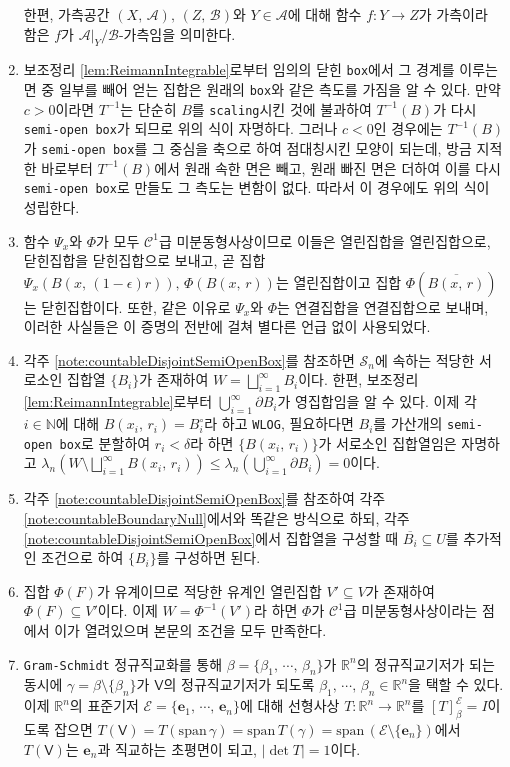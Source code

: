 \begin{enumerate}[label = \textsf{\textbf{\arabic*}}]
    한편, 가측공간 $(X,\,\mathcal{A}),\,(Z,\,\mathcal{B})$와 $Y\in\mathcal{A}$에 대해 함수 $f:Y\to Z$가 가측이라 함은 $f$가 $\mathcal{A}\vert_Y/\mathcal{B}$-가측임을 의미한다.
    \item 보조정리 \ref{lem:ReimannIntegrable}로부터 임의의 닫힌 \texttt{box}에서 그 경계를 이루는 면 중 일부를 빼어 얻는 집합은 원래의 \texttt{box}와 같은 측도를 가짐을 알 수 있다. 만약 $c>0$이라면 $T^{-1}$는 단순히 $B$를 \texttt{scaling}시킨 것에 불과하여 $T^{-1}(B)$가 다시 \texttt{semi-open box}가 되므로 위의 식이 자명하다. 그러나 $c<0$인 경우에는 $T^{-1}(B)$가 \texttt{semi-open box}를 그 중심을 축으로 하여 점대칭시킨 모양이 되는데, 방금 지적한 바로부터 $T^{-1}(B)$에서 원래 속한 면은 빼고, 원래 빠진 면은 더하여 이를 다시 \texttt{semi-open box}로 만들도 그 측도는 변함이 없다. 따라서 이 경우에도 위의 식이 성립한다.
    \item 함수 $\Psi_x$와 $\Phi$가 모두 $\mathcal{C}^1$급 미분동형사상이므로 이들은 열린집합을 열린집합으로, 닫힌집합을 닫힌집합으로 보내고, 곧 집합 $\Psi_x(B(x,\,(1-\epsilon)r)),\,\Phi(B(x,\,r))$는 열린집합이고 집합 $\Phi(\overline{B(x,\,r)})$는 닫힌집합이다. 또한, 같은 이유로 $\Psi_x$와 $\Phi$는 연결집합을 연결집합으로 보내며, 이러한 사실들은 이 증명의 전반에 걸쳐 별다른 언급 없이 사용되었다.
    \item 각주 \ref{note:countableDisjointSemiOpenBox}를 참조하면 $\mathcal{S}_n$에 속하는 적당한 서로소인 집합열 $\{B_i\}$가 존재하여 $W=\bigsqcup_{i=1}^\infty B_i$이다. 한편, 보조정리 \ref{lem:ReimannIntegrable}로부터 $\bigcup_{i=1}^\infty\partial B_i$가 영집합임을 알 수 있다. 이제 각 $i\in\mathbb{N}$에 대해 $B(x_i,\,r_i)=B_i^\circ$라 하고 \texttt{WLOG}, 필요하다면 $B_i$를 가산개의 \texttt{semi-open box}로 분할하여 $r_i<\delta$라 하면 $\{B(x_i,\,r_i)\}$가 서로소인 집합열임은 자명하고 $\lambda_n(W\setminus\bigsqcup_{i=1}^\infty B(x_i,\,r_i))\leq\lambda_n(\bigcup_{i=1}^\infty\partial B_i)=0$이다.
    \item 각주 \ref{note:countableDisjointSemiOpenBox}를 참조하여 각주 \ref{note:countableBoundaryNull}에서와 똑같은 방식으로 하되, 각주 \ref{note:countableDisjointSemiOpenBox}에서 집합열을 구성할 때 $\overline{B_i}\subseteq U$를 추가적인 조건으로 하여 $\{B_i\}$를 구성하면 된다.
    \item 집합 $\Phi(F)$가 유계이므로 적당한 유계인 열린집합 $V'\subseteq V$가 존재하여 $\Phi(F)\subseteq V'$이다. 이제 $W=\Phi^{-1}(V')$라 하면 $\Phi$가 $\mathcal{C}^1$급 미분동형사상이라는 점에서 이가 열려있으며 본문의 조건을 모두 만족한다.
    \item \texttt{Gram-Schmidt} 정규직교화를 통해 $\beta=\{\beta_1,\,\cdots,\,\beta_n\}$가 $\mathbb{R}^n$의 정규직교기저가 되는 동시에 $\gamma=\beta\setminus\{\beta_n\}$가 $\mathsf{V}$의 정규직교기저가 되도록 $\beta_1,\,\cdots,\,\beta_n\in\mathbb{R}^n$을 택할 수 있다. 이제 $\mathbb{R}^n$의 표준기저 $\mathcal{E}=\{\mathbf{e}_1,\,\cdots,\,\mathbf{e}_n\}$에 대해 선형사상 $T:\mathbb{R}^n\to\mathbb{R}^n$를 $[T]_\beta^\mathcal{E}=I$이도록 잡으면 $T(\mathsf{V})=T(\mathrm{span}\,\gamma)=\mathrm{span}\,T(\gamma)=\mathrm{span}\,(\mathcal{E}\setminus\{\mathbf{e}_n\})$에서 $T(\mathsf{V})$는 $\mathbf{e}_n$과 직교하는 초평면이 되고, $|\det T|=1$이다.

\end{enumerate}
